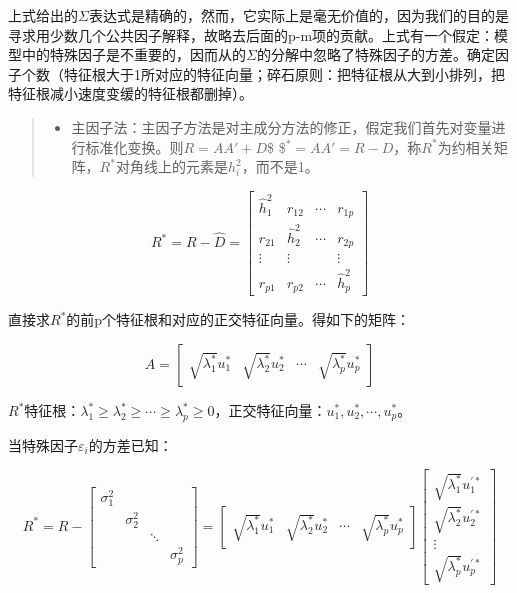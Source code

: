 \documentclass[]{ctexbook}
\providecommand{\tightlist}{%
  \setlength{\itemsep}{0pt}\setlength{\parskip}{0pt}}
\begin{document}
上式给出的\(\Sigma\)表达式是精确的，然而，它实际上是毫无价值的，因为我们的目的是寻求用少数几个公共因子解释，故略去后面的p-m项的贡献。上式有一个假定：模型中的特殊因子是不重要的，因而从的\(\Sigma\)的分解中忽略了特殊因子的方差。确定因子个数（特征根大于1所对应的特征向量；碎石原则：把特征根从大到小排列，把特征根减小速度变缓的特征根都删掉）。

\begin{quote}
\begin{itemize}
\tightlist
\item
  主因子法：主因子方法是对主成分方法的修正，假定我们首先对变量进行标准化变换。则\(R=AA'+D\)\$ \$\(^{\ast}=AA'=R-D\)，称\(R^{\ast}\)为约相关矩阵，\(R^{\ast}\)对角线上的元素是\(h_i^2\)，而不是1。
\end{itemize}
\end{quote}

\[R^{\ast}=R-\hat D=\begin {bmatrix}\hat h_1^2&r_{12}&\cdots&r_{1p}\\r_{21}&\hat h_2^2&\cdots&r_{2p}\\\vdots&\vdots&&\vdots\\r_{p1}&r_{p2}&\cdots&\hat h_p^2 \end {bmatrix}\]

直接求\(R^{\ast}\)的前p个特征根和对应的正交特征向量。得如下的矩阵：

\[A=\begin {bmatrix}\sqrt{\lambda_1^{\ast}}u_1^{\ast}&\sqrt{\lambda_2^{\ast}}u_2^{\ast}&\cdots&\sqrt{\lambda_p^{\ast}}u_p^{\ast} \end {bmatrix}\]

\(R^{\ast}\)特征根：\(\lambda_1^{\ast}\ge\lambda_2^{\ast}\ge\cdots\ge\lambda_p^{\ast}\ge0\)，正交特征向量：\(u_1^{\ast},u_2^{\ast},\cdots,u_p^{\ast}\)。

当特殊因子\(\varepsilon_i\)的方差已知：

\[R^{\ast}=R-\begin {bmatrix}\sigma_1^2&&&\\&\sigma_2^2&&\\&&\ddots&\\&&&\sigma_p^2 \end {bmatrix}=\begin {bmatrix}\sqrt{\lambda_1^{\ast}}u_1^{\ast}&\sqrt{\lambda_2^{\ast}}u_2^{\ast}&\cdots&\sqrt{\lambda_p^{\ast}}u_p^{\ast} \end {bmatrix}\begin {bmatrix}\sqrt{\lambda_1^{\ast}}u_1^{'\ast}\\\sqrt{\lambda_2^{\ast}}u_2^{'\ast}\\\vdots\\\sqrt{\lambda_p^{\ast}}u_p^{'\ast} \end {bmatrix}\]
\end{document}
